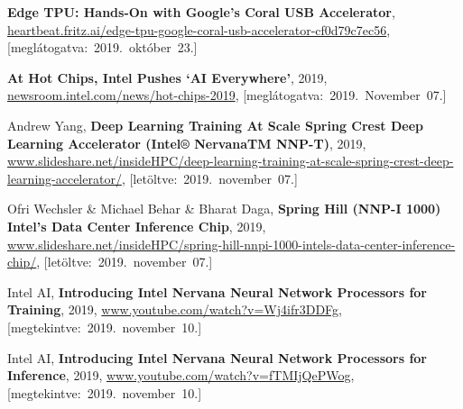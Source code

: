 \begin{thebibliography}{9}
	\textbf{Edge TPU: Hands-On with Google’s Coral USB Accelerator},
	{\footnotesize\url{heartbeat.fritz.ai/edge-tpu-google-coral-usb-accelerator-cf0d79c7ec56}},
	\mbox{[meglátogatva:~2019.~október~23.]}




	\textbf{At Hot Chips, Intel Pushes ‘AI Everywhere’},
	2019,
	{\footnotesize\url{newsroom.intel.com/news/hot-chips-2019}},
	\mbox{[meglátogatva:~2019.~November~07.]}

	Andrew Yang,
	\textbf{Deep Learning Training At Scale	Spring Crest Deep Learning Accelerator (Intel® NervanaTM NNP-T)},
	2019,
	{\footnotesize\url{www.slideshare.net/insideHPC/deep-learning-training-at-scale-spring-crest-deep-learning-accelerator/}},
	\mbox{[letöltve:~2019.~november~07.]}

	Ofri Wechsler \& Michael Behar \& Bharat Daga,
	\textbf{Spring Hill (NNP-I 1000) Intel’s Data Center Inference Chip},
	2019,
	{\footnotesize\url{www.slideshare.net/insideHPC/spring-hill-nnpi-1000-intels-data-center-inference-chip/}},
	\mbox{[letöltve:~2019.~november~07.]}

Intel AI,
\textbf{Introducing Intel Nervana Neural Network Processors for Training},
2019,
{\footnotesize\url{www.youtube.com/watch?v=Wj4ifr3DDFg}},
\mbox{[megtekintve:~2019.~november~10.]}

	Intel AI,
	\textbf{Introducing Intel Nervana Neural Network Processors for Inference},
	2019,
	{\footnotesize\url{www.youtube.com/watch?v=fTMIjQePWog}},
	\mbox{[megtekintve:~2019.~november~10.]}




\end{thebibliography}
